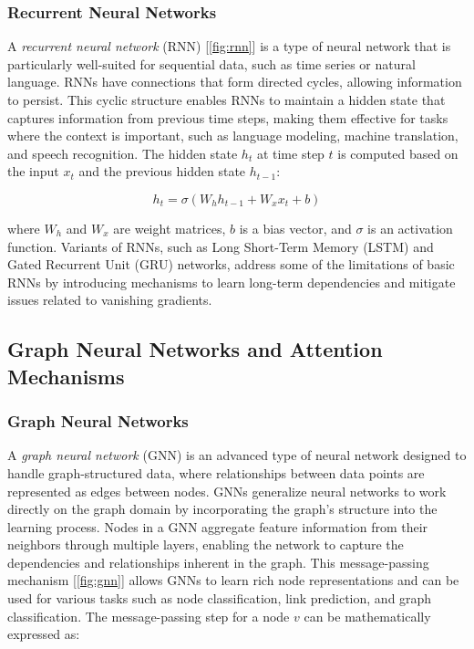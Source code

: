 \documentclass[../Thesis.tex]{subfiles}
\begin{document}
	
	
	\subsubsection{Recurrent Neural Networks}
	A \emph{recurrent neural network} (RNN) [\autoref{fig:rnn}] is a type of neural network that is particularly well-suited for sequential data, such as time series or natural language. RNNs have connections that form directed cycles, allowing information to persist. This cyclic structure enables RNNs to maintain a hidden state that captures information from previous time steps, making them effective for tasks where the context is important, such as language modeling, machine translation, and speech recognition. The hidden state \(h_t\) at time step \(t\) is computed based on the input \(x_t\) and the previous hidden state \(h_{t-1}\):
	
	\[
	h_t = \sigma(W_h h_{t-1} + W_x x_t + b)
	\]
	
	where \(W_h\) and \(W_x\) are weight matrices, \(b\) is a bias vector, and \(\sigma\) is an activation function. Variants of RNNs, such as Long Short-Term Memory (LSTM) and Gated Recurrent Unit (GRU) networks, address some of the limitations of basic RNNs by introducing mechanisms to learn long-term dependencies and mitigate issues related to vanishing gradients.
	
	
	
	\subsection{Graph Neural Networks and Attention Mechanisms}
	
	\subsubsection{Graph Neural Networks}
	A \emph{graph neural network} (GNN) is an advanced type of neural network designed to handle graph-structured data, where relationships between data points are represented as edges between nodes. GNNs generalize neural networks to work directly on the graph domain by incorporating the graph's structure into the learning process. Nodes in a GNN aggregate feature information from their neighbors through multiple layers, enabling the network to capture the dependencies and relationships inherent in the graph. This message-passing mechanism [\autoref{fig:gnn}] allows GNNs to learn rich node representations and can be used for various tasks such as node classification, link prediction, and graph classification. The message-passing step for a node \(v\) can be mathematically expressed as:
	
\end{document}
